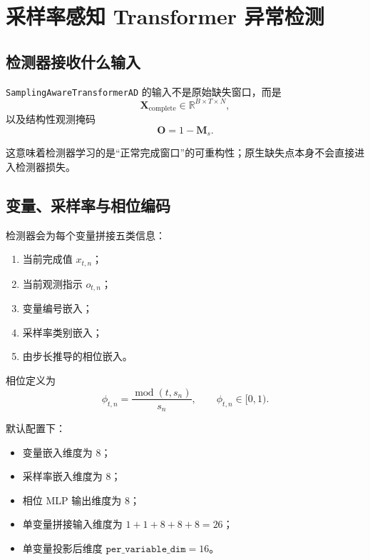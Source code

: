 \documentclass[UTF8]{ctexart}
\newcommand{\code}[1]{\texttt{#1}}
\begin{document}
\section{采样率感知 Transformer 异常检测}

\subsection{检测器接收什么输入}

\code{SamplingAwareTransformerAD} 的输入不是原始缺失窗口，而是
\begin{equation}
    \bm{X}_{\text{complete}} \in \mathbb{R}^{B \times T \times N},
\end{equation}
以及结构性观测掩码
\begin{equation}
    \bm{O} = 1 - \bm{M}_s.
\end{equation}

这意味着检测器学习的是“正常完成窗口”的可重构性；原生缺失点本身不会直接进入检测器损失。

\subsection{变量、采样率与相位编码}

检测器会为每个变量拼接五类信息：
\begin{enumerate}
    \item 当前完成值 \(x_{t,n}\)；
    \item 当前观测指示 \(o_{t,n}\)；
    \item 变量编号嵌入；
    \item 采样率类别嵌入；
    \item 由步长推导的相位嵌入。
\end{enumerate}

相位定义为
\begin{equation}
    \phi_{t,n} = \frac{\operatorname{mod}(t,s_n)}{s_n}, \qquad \phi_{t,n}\in[0,1).
\end{equation}

默认配置下：
\begin{itemize}
    \item 变量嵌入维度为 \(8\)；
    \item 采样率嵌入维度为 \(8\)；
    \item 相位 MLP 输出维度为 \(8\)；
    \item 单变量拼接输入维度为 \(1+1+8+8+8=26\)；
    \item 单变量投影后维度 \(\texttt{per\_variable\_dim}=16\)。
\end{itemize}
\end{document}

